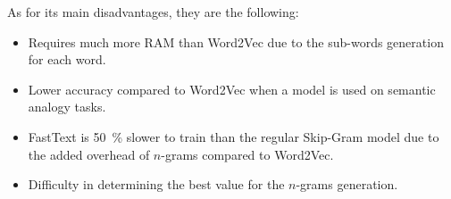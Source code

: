 As for its main disadvantages, they are the following:
\begin{multicols}{2}
\begin{itemize}
\item Requires much more RAM than Word2Vec due to the sub-words generation for
each word.
\item Lower accuracy compared to Word2Vec when a model is used on semantic
analogy tasks.
\item FastText is \SI{50}{\percent} slower to train than the regular Skip-Gram model due
to the added overhead of $n$-grams compared to Word2Vec.
\item Difficulty in determining the best value for the $n$-grams generation.
\end{itemize}
\end{multicols}

